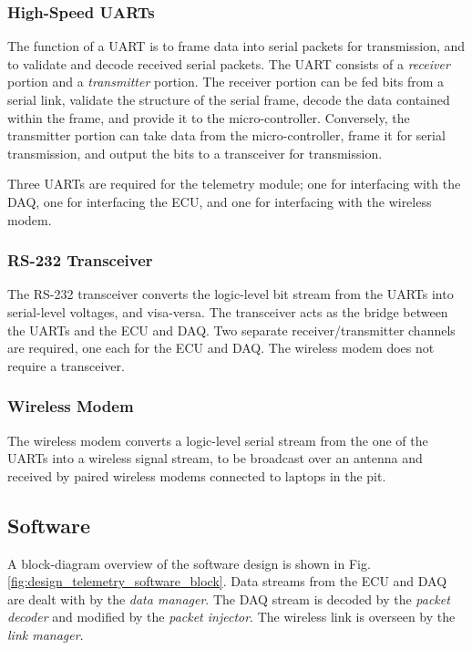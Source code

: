 \subsubsection{High-Speed UARTs}

The function of a UART is to frame data into serial packets for transmission, and to validate and decode received serial packets. The UART consists of a \emph{receiver} portion and a \emph{transmitter} portion. The receiver portion can be fed bits from a serial link, validate the structure of the serial frame, decode the data contained within the frame, and provide it to the micro-controller. Conversely, the transmitter portion can take data from the micro-controller, frame it for serial transmission, and output the bits to a transceiver for transmission.

Three UARTs are required for the telemetry module; one for interfacing with the DAQ, one for interfacing the ECU, and one for interfacing with the wireless modem. 

\subsubsection{RS-232 Transceiver\label{sec:design_telemetry_rs232}}

The RS-232 transceiver converts the logic-level bit stream from the UARTs into serial-level voltages, and visa-versa. The transceiver acts as the bridge between the UARTs and the ECU and DAQ. Two separate receiver/transmitter channels are required, one each for the ECU and DAQ. The wireless modem does not require a transceiver.

\subsubsection{Wireless Modem}

The wireless modem converts a logic-level serial stream from the one of the UARTs into a wireless signal stream, to be broadcast over an antenna and received by paired wireless modems connected to laptops in the pit. 

\subsection{Software}
	
A block-diagram overview of the software design is shown in Fig. \ref{fig:design_telemetry_software_block}. Data streams from the ECU and DAQ are dealt with by the \emph{data manager}. The DAQ stream is decoded by the \emph{packet decoder} and modified by the \emph{packet injector}. The wireless link is overseen by the \emph{link manager}. 

